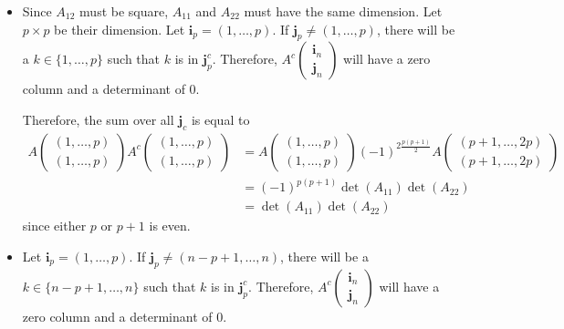 \begin{solution}
  \begin{itemize}
    \item
      Since $A_{12}$ must be square,
      $A_{11}$ and $A_{22}$ must have the same dimension.
      Let $p \times p$ be their dimension.
      Let $\mathbf{i}_p = (1, \ldots, p)$.
      If $\mathbf{j}_p \neq (1, \ldots, p)$,
      there will be a $k \in \{1, \ldots, p\}$ such that
      $k$ is in $\mathbf{j}_p^c$.
      Therefore,
      \(
      A^c
      \begin{pmatrix}
        \mathbf{i}_n\\
        \mathbf{j}_n
      \end{pmatrix}
      \)
      will have a zero column and a determinant of 0.

      Therefore, the sum over all $\mathbf{j}_c$
      is equal to
      \begin{align*}
        A
        \begin{pmatrix}
          (1, \ldots, p)\\
          (1, \ldots, p)
        \end{pmatrix}
        A^c
        \begin{pmatrix}
          (1, \ldots, p)\\
          (1, \ldots, p)
        \end{pmatrix}
        & = A
        \begin{pmatrix}
          (1, \ldots, p)\\
          (1, \ldots, p)
        \end{pmatrix}
        (-1)^{2\frac{p(p+1)}{2}}
        A
        \begin{pmatrix}
          (p+1, \ldots, 2p)\\
          (p+1, \ldots, 2p)
        \end{pmatrix}\\
        & = (-1)^{p(p+1)}\det(A_{11}) \det(A_{22})\\
        & = \det(A_{11}) \det(A_{22})
      \end{align*}
      since either $p$ or $p+1$ is even.
    \item
      Let $\mathbf{i}_p = (1, \ldots, p)$.
      If $\mathbf{j}_p \neq (n-p+1, \ldots, n)$,
      there will be a $k \in \{n-p+1, \ldots, n\}$ such that
      $k$ is in $\mathbf{j}_p^c$.
      Therefore,
      \(
      A^c
      \begin{pmatrix}
        \mathbf{i}_n\\
        \mathbf{j}_n
      \end{pmatrix}
      \)
      will have a zero column and a determinant of 0.


\end{itemize}
\end{solution}
